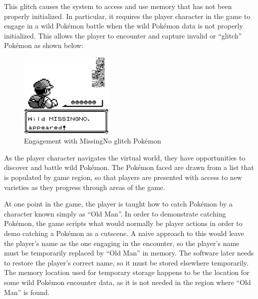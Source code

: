 \documentclass[letterpaper]{article}
\begin{document}
This glitch causes the system to access and use memory that has not been properly initialized. In particular, it requires the player character in the game to engage in a wild Pokémon battle when the wild Pokémon data is not properly initialized. This allows the player to encounter and capture invalid or ``glitch'' Pokémon as shown below:

\begin{figure}[h!]
    \centering
    \includegraphics[width=0.4\textwidth]{missingno.png}
    \caption{Engagement with MissingNo glitch Pokémon}
\end{figure}

As the player character navigates the virtual world, they have opportunities to discover and battle wild Pokémon. The Pokémon faced are drawn from a list that is populated by game region, so that players are presented with access to new varieties as they progress through areas of the game.

At one point in the game, the player is taught how to catch Pokémon by a character known simply as ``Old Man''. In order to demonstrate catching Pokémon, the game scripts what would normally be player actions in order to demo catching a Pokémon as a cutscene. A naive approach to this would leave the player's name as the one engaging in the encounter, so the player's name must be temporarily replaced by ``Old Man'' in memory. The software later needs to restore the player's correct name, so it must be stored elsewhere temporarily. The memory location used for temporary storage happens to be the location for some wild Pokémon encounter data, as it is not needed in the region where ``Old Man'' is found.
\end{document}
